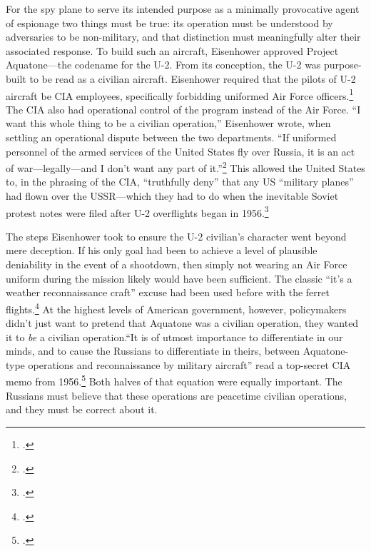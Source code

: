 \documentclass[14pt]{extarticle}
\begin{document}
For the spy plane to serve its intended purpose as a minimally provocative agent of espionage two things must be true: its operation must be understood by adversaries to be non-military, and that distinction must meaningfully alter their associated response. To build such an aircraft, Eisenhower approved Project Aquatone---the codename for the U-2. From its conception, the U-2 was purpose-built to be read as a civilian aircraft. Eisenhower required that the pilots of U-2 aircraft be CIA employees, specifically forbidding uniformed Air Force officers.\footcite[p.~33, Though many of the pilots did have Air Force backgrounds.]{lindgren_trust_2000} The CIA also had operational control of the program instead of the Air Force. \enquote{I want this whole thing to be a civilian operation,} Eisenhower wrote, when settling an operational dispute between the two departments. \enquote{If uniformed personnel of the armed services of the United States fly over Russia, it is an act of war---legally---and I don't want any part of it.}\footcite[p.~60. The original source for this quote is an \emph{OSA History} that requires codeword clearance. It is quoted here by the History Staff of the CIA.]{pedlow_central_1992} This allowed the United States to, in the phrasing of the CIA, \enquote{truthfully deny} that any US \enquote{military planes} had flown over the USSR---which they had to do when the inevitable Soviet protest notes were filed after U-2 overflights began in 1956.\footcite[p.~109]{pedlow_central_1992}

The steps Eisenhower took to ensure the U-2 civilian's character went beyond mere deception. If his only goal had been to achieve a level of plausible deniability in the event of a shootdown, then simply not wearing an Air Force uniform during the mission likely would have been sufficient. The classic \enquote{it's a weather reconnaissance craft} excuse had been used before with the ferret flights.\footcite[p.~45]{farquhar_aerial_2015} At the highest levels of American government, however, policymakers didn't just want to pretend that Aquatone was a civilian operation, they wanted it to \emph{be} a civilian operation.\enquote{It is of utmost importance to differentiate in our minds, and to cause the Russians to differentiate in theirs, between Aquatone-type operations and reconnaissance by military aircraft} read a top-secret CIA memo from 1956.\footcite[p.~1]{miller_suggestions_1956} Both halves of that equation were equally important. The Russians must believe that these operations are peacetime civilian operations, and they must be correct about it.
\end{document}
